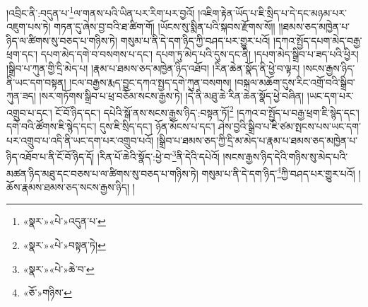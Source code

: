 །འབྲིང་ནི་:བདུན་པ་\footnote{«སྣར་»«པེ་»འདུན་པ་}ལ་གནས་པའི་ཡིན་པར་རིག་པར་བྱའོ། །འཇིག་རྟེན་ཡོད་པ་ཇི་སྲིད་པ་དེ་དང་མཉམ་པར་འཇུག་པས་ཏེ། གཏན་དུ་ཞེས་བྱ་བའི་ཐ་ཚིག་གོ། །ཡོངས་སུ་སྨིན་པའི་སྐབས་རྫོགས་སོ།། །།ཐམས་ཅད་མཁྱེན་པ་ཉིད་ལ་ཚིགས་སུ་བཅད་པ་གཉིས་ཏེ། གསུམ་པ་ནི་དེ་དག་ཉིད་ཀྱི་བཤད་པར་གྱུར་པའོ། །དཀའ་སྤྱོད་དཔག་མེད་བརྒྱ་ཕྲག་དང་། དཔག་མེད་དགེ་བ་བསགས་པ་དང་། དཔག་ཏུ་མེད་པའི་དུས་དང་ནི། །དཔག་མེད་སྒྲིབ་པ་ཟད་པའི་ཕྱིར། །སྒྲིབ་པ་ཀུན་གྱི་དྲི་མེད་པ། །རྣམ་པ་ཐམས་ཅད་མཁྱེན་ཉིད་འཐོབ། །རིན་ཆེན་སྣོད་ནི་ཕྱེ་བ་ལྟར། །སངས་རྒྱས་ཉིད་ནི་ཡང་དག་བསྟན། །ངལ་བརྒྱས་རྨད་བྱུང་དཀའ་སྤྱད་དགེ་ཀུན་བསགས། །བསྐལ་མཆོག་དུས་རིང་འགྲོ་བའི་སྒྲིབ་ཀུན་ཟད། །སར་གཏོགས་སྒྲིབ་པ་ཕྲ་བཅོམ་སངས་རྒྱས་ཏེ། །དེ་ནི་མཐུ་ཆེ་རིན་ཆེན་སྣོད་ཕྱེ་བཞིན། །ཡང་དག་པར་འགྲུབ་པ་དང་། ངོ་བོ་ཉིད་དང་། དཔེའི་སྒོ་ནས་སངས་རྒྱས་ཉིད་:བསྟན་ཏོ།\footnote{«སྣར་»«པེ་»བསྟན་ཏེ།} །དཀའ་བ་སྤྱོད་པ་བརྒྱ་ཕྲག་ཇི་སྙེད་དང་། དགེ་བའི་ཚོགས་ཇི་སྙེད་དང་། དུས་ཇི་སྲིད་དང་། ཉོན་མོངས་པ་དང་། ཤེས་བྱའི་སྒྲིབ་པ་ཇི་ཙམ་སྤངས་པས་ཡང་དག་པར་འགྲུབ་པ་འདི་ནི་ཡང་དག་པར་འགྲུབ་པའོ། །སྒྲིབ་པ་ཐམས་ཅད་ཀྱི་དྲི་མ་མེད་པ་རྣམ་པ་ཐམས་ཅད་མཁྱེན་པ་ཉིད་འཐོབ་པ་ནི་ངོ་བོ་ཉིད་དོ། །རིན་པོ་ཆེའི་སྣོད་:ཕྱེ་བ་\footnote{«སྣར་»«པེ་»ཆེ་བ་}ནི་དེའི་དཔེའོ། །སངས་རྒྱས་ཉིད་དེའི་གཉིས་སུ་མེད་པའི་མཚན་ཉིད་མཐུ་དང་བཅས་པ་ལ་ཚིགས་སུ་བཅད་པ་གཉིས་ཏེ། གསུམ་པ་ནི་དེ་དག་ཉིད་\footnote{«ཅོ་»གཉིས་}ཀྱི་བཤད་པར་གྱུར་པའོ། །ཆོས་རྣམས་ཐམས་ཅད་སངས་རྒྱས་ཉིད། །
